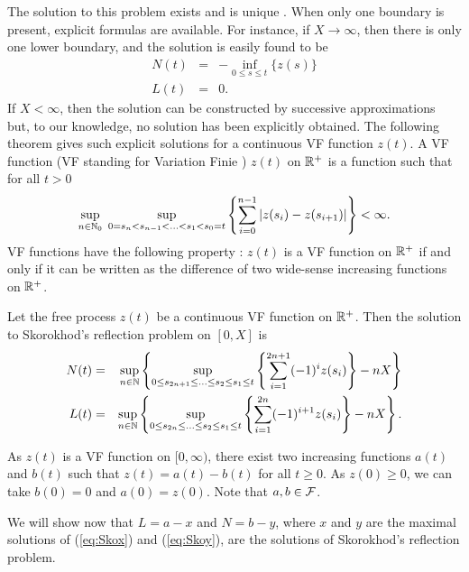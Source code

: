 The solution to this problem exists and is unique \cite{Harrison}.
When only one boundary is present, explicit formulas are available.
For instance,
if $X \rightarrow \infty$, then there is only one lower boundary, and
the solution
is easily found to be
\begin{eqnarray*}
N(t) & = & -\inf_{0 \leq s \leq t} \{ z(s) \} \\
L(t) & = & 0.
\end{eqnarray*}
If $X <  \infty$, then the solution can be constructed by successive
approximations
but, to our knowledge,  no solution has been explicitly obtained.
The following theorem gives such explicit solutions for a continuous
VF function $z(t)$.
A VF function (VF standing for Variation Finie \cite{Harrison,
Royden}) $z(t)$ on $\mathbb{R}^+$ is a function such that for all $t > 0$
\[ \sup_{n \in \mathbb{N}_0} \; \sup_{0 = s_n < s_{n-1} < \ldots < s_1 < s_0
=t} \left\{ \sum_{i=0}^{n-1} |z(s_i) - z(s_{i+1})| \right\} <
\infty .\] VF functions have the following property \cite{Royden}:
$z(t)$ is a VF function on $\mathbb{R}^+$ if and only if it can be
written as the difference of two wide-sense increasing functions
on $\mathbb{R}^+$.

\begin{theorem} 
Let the free process $z(t)$ be a continuous VF function on $\mathbb{R}^+$.
Then the solution to Skorokhod's reflection problem on $[0,X]$ is
\begin{eqnarray}
\mylabel{eq:N(t)}
N(t) & = & \sup_{n \in \Nats}  \left\{ \sup_{0  \leq s_{2n+1} \leq
\ldots \leq s_2 \leq s_1 \leq t}
  \left\{ \sum_{i=1}^{2n+1} (-1)^{i} z(s_{i}) \right\} - nX \right\}
\\
\mylabel{eq:L(t)}
L(t) & = & \sup_{n \in \Nats}  \left\{ \sup_{0  \leq s_{2n} \leq \ldots
\leq s_2 \leq s_1 \leq t}
  \left\{ \sum_{i=1}^{2n} (-1)^{i+1} z(s_{i}) \right\} - nX \right\}.
\end{eqnarray}
\end{theorem}


\pr
As $z(t)$ is a VF function on $[0,\infty)$, there exist two
increasing functions $a(t)$ and $b(t)$ such that $z(t)= a(t) -
b(t)$ for all $t \geq 0$. As $z(0) \geq 0$, we can take $b(0) = 0$
and $a(0) = z(0)$. Note that $a, b \in \mathcal F$.

We will show now that $L = a -x$ and $N = b - y$, where $x$ and
$y$ are the maximal solutions of (\ref{eq:Skox}) and
(\ref{eq:Skoy}), are the solutions of Skorokhod's reflection
problem.
%

